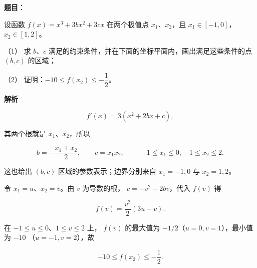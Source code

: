 \begin{answer}

\textbf{题目}：

设函数 $f(x)=x^3+3bx^2+3cx$ 在两个极值点 $x_1\text{、}x_2$，且 $x_1\in[-1,0]$，$x_2\in[1,2]$。
\nopagebreak[4]
\begin{center}\end{center}
\nopagebreak[4]
（1） 求 $b\text{、}c$ 满足的约束条件，并在下面的坐标平面内，画出满足这些条件的点 $(b,c)$ 的区域；

（2） 证明：$-10\leqslant f(x_2)\leqslant-\dfrac12$。

\textbf{解析}


\nopagebreak[4]
\[
f'(x)=3(x^2+2bx+c),
\]

其两个根就是 $x_1\text{、}x_2$，所以

\nopagebreak[4]
\[
b=-\frac{x_1+x_2}{2},\qquad c=x_1x_2,\qquad
-1\leqslant x_1\leqslant0,\quad1\leqslant x_2\leqslant2.
\]

这也给出 $(b,c)$ 区域的参数表示；边界分别来自
$x_1=-1,0$ 与 $x_2=1,2$。


令 $x_1=u$、$x_2=v$。由 $v$ 为导数的根，
$c=-v^2-2bv$，代入 $f(v)$ 得

\nopagebreak[4]
\[
f(v)=\frac{v^2}{2}(3u-v).
\]

在 $-1\leqslant u\leqslant0$、$1\leqslant v\leqslant2$ 上，
$f(v)$ 的最大值为 $-1/2$（$u=0,v=1$），最小值为 $-10$
（$u=-1,v=2$），故

\nopagebreak[4]
\[
-10\leqslant f(x_2)\leqslant-\frac12.
\]



\end{answer}
